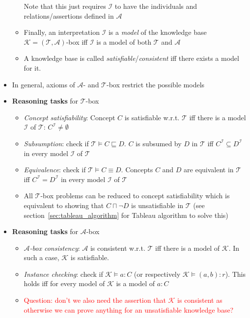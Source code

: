 \begin{itemize}
\begin{itemize}
		Note that this just requires $\mathcal{I}$ to have the individuals and relations/assertions defined in $\mathcal{A}$
		\item Finally, an interpretation $\mathcal{I}$ is a \textit{model} of the knowledge base $\mathcal{K} = (\mathcal{T},\mathcal{A})$-box iff $\mathcal{I}$ is a model of both $\mathcal{T}$ and $\mathcal{A}$
		\item A knowledge base is called \textit{satisfiable}/\textit{consistent} iff there exists a model for it.
	\end{itemize}
	\item In general, axioms of $\mathcal{A}$- and $\mathcal{T}$-box restrict the possible models
	\item \textbf{Reasoning tasks} for $\mathcal{T}$-box
	\begin{itemize}
		\item \textit{Concept satisfiability}: Concept $C$ is satisfiable w.r.t. $\mathcal{T}$ iff there is a model $\mathcal{I}$ of $\mathcal{T}$: $C^{\mathcal{I}} \neq \emptyset$
		\item \textit{Subsumption}: check if $\mathcal{T} \models C\sqsubseteq D$. $C$ is subsumed by $D$ in $\mathcal{T}$ iff $C^{\mathcal{I}}\subseteq D^{\mathcal{I}}$ in every model $\mathcal{I}$ of $\mathcal{T}$
		\item \textit{Equivalence}: check if $\mathcal{T} \models C\equiv D$. Concepts $C$ and $D$ are equivalent in $\mathcal{T}$ iff $C^{\mathcal{I}} = D^{\mathcal{I}}$ in every model $\mathcal{I}$ of $\mathcal{T}$
		\item All $\mathcal{T}$-box problems can be reduced to concept satisfiability which is equivalent to showing that $C\sqcap \lnot D$ is unsatisfiable in $\mathcal{T}$ (see section~\ref{sec:tableau_algorithm} for Tableau algorithm to solve this)
	\end{itemize}
	\item \textbf{Reasoning tasks} for $\mathcal{A}$-box
	\begin{itemize}
		\item \textit{$\mathcal{A}$-box consistency}: $\mathcal{A}$ is consistent w.r.t. $\mathcal{T}$ iff there is a model of $\mathcal{K}$. In such a case, $\mathcal{K}$ is satisfiable.
		\item \textit{Instance checking}: check if $\mathcal{K} \models a:C$ (or respectively $\mathcal{K} \models (a,b) : r$). This holds iff for every model of $\mathcal{K}$ is a model of $a:C$
		\item \textcolor{red}{Question: don't we also need the assertion that $\mathcal{K}$ is consistent as otherwise we can prove anything for an unsatisfiable knowledge base?}

\end{itemize}
\end{itemize}
